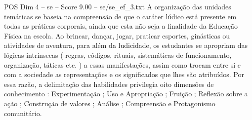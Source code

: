\begin{textsample}{POS Dim 4 – se – Score 9.00 – se/se\_ef\_3.txt}
A organização das unidades temáticas se baseia na compreensão de que o caráter lúdico está presente em todas as práticas corporais, ainda que esta não seja a finalidade da Educação Física na escola.
Ao brincar, dançar, jogar, praticar esportes, ginásticas ou atividades de aventura, para além da ludicidade, os estudantes se apropriam das lógicas intrínsecas ( regras, códigos, rituais, sistemáticas de funcionamento, organização, táticas etc. ) a essas manifestações, assim como trocam entre si e com a sociedade as representações e os significados que lhes são atribuídos.
Por essa razão, a delimitação das habilidades privilegia oito dimensões de conhecimento : Experimentação ; Uso e Apropriação ; Fruição ; Reflexão sobre a ação ; Construção de valores ; Análise ; Compreensão e Protagonismo comunitário.

\end{textsample}
